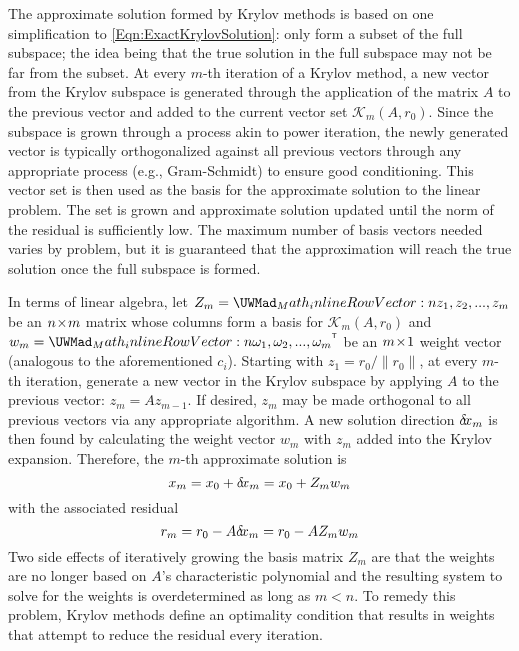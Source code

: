 \documentclass[12pt]{UWMadThesis}
\begin{document}
The approximate solution formed by Krylov methods is based on one simplification to \cref{Eqn:ExactKrylovSolution}: only form a subset of the full subspace; the idea being that the true solution in the full subspace may not be far from the subset.
At every $m$-th iteration of a Krylov method, a new vector from the Krylov subspace is generated through the application of the matrix $A$ to the previous vector and added to the current vector set $\mathcal{K}_m(A,r_0)$.
Since the subspace is grown through a process akin to power iteration, the newly generated vector is typically orthogonalized against all previous vectors through any appropriate process (e.g., Gram-Schmidt) to ensure good conditioning.
This vector set is then used as the basis for the approximate solution to the linear problem.
The set is grown and approximate solution updated until the norm of the residual is sufficiently low.
The maximum number of basis vectors needed varies by problem, but it is guaranteed that the approximation will reach the true solution once the full subspace is formed.


In terms of linear algebra, let $Z_m = \irowvec{z_1,z_2,...,z_m}$ be an $n \!\times\! m$ matrix whose columns form a basis for $\mathcal{K}_m(A,r_0)$ and $w_m = \icolvec{\omega_1,\omega_2,...,\omega_m}$ be an $m \!\times\! 1$ weight vector (analogous to the aforementioned $c_i$).
Starting with $z_1 = r_0/\|r_0\|$, at every $m$-th iteration, generate a new vector in the Krylov subspace by applying $A$ to the previous vector: $z_m = A z_{m-1}$.
If desired, $z_m$ may be made orthogonal to all previous vectors via any appropriate algorithm.
A new solution direction $\delta \mkern-3.00mu x_m$ is then found by calculating the weight vector $w_m$ with $z_m$ added into the Krylov expansion.
Therefore, the $m$-th approximate solution is
\begin{equation}
    x_m = x_0 + \delta \mkern-3.00mu x_m = x_0 + Z_m w_m \label{Eqn:ApproximateKrylovSolution}
\end{equation}
with the associated residual
\begin{equation}
    r_m = r_0 - A\delta \mkern-3.00mu x_m = r_0 - A Z_m w_m \label{Eqn:ApproximateKrylovResidual}
\end{equation}
Two side effects of iteratively growing the basis matrix $Z_m$ are that the weights are no longer based on $A$'s characteristic polynomial and the resulting system to solve for the weights is overdetermined as long as $m < n$.
To remedy this problem, Krylov methods define an optimality condition that results in weights that attempt to reduce the residual every iteration.
\end{document}
